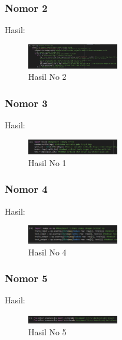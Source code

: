 \subsubsection{Nomor 2}
\hfill\break

Hasil:
\begin{figure}[H]
\centering
	\includegraphics[width=4cm]{figures/1174057/chapter7/no2.jpg}
	\caption{Hasil No 2}
\end{figure}

\subsubsection{Nomor 3}
\hfill\break

Hasil:
\begin{figure}[H]
\centering
	\includegraphics[width=4cm]{figures/1174057/chapter7/no3.jpg}
	\caption{Hasil No 1}
\end{figure}

\subsubsection{Nomor 4}
\hfill\break

Hasil:
\begin{figure}[H]
\centering
	\includegraphics[width=4cm]{figures/1174057/chapter7/no4.jpg}
	\caption{Hasil No 4}
\end{figure}

\subsubsection{Nomor 5}
\hfill\break

Hasil:
\begin{figure}[H]
\centering
	\includegraphics[width=4cm]{figures/1174057/chapter7/no5.jpg}
	\caption{Hasil No 5}
\end{figure}

